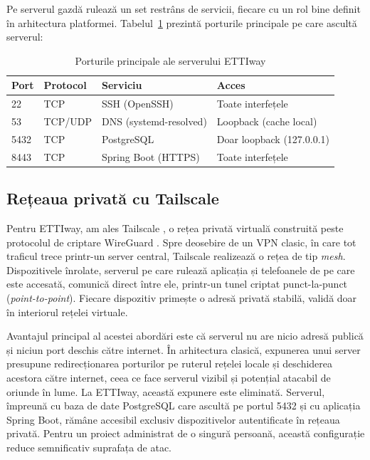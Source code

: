 Pe serverul gazdă rulează un set restrâns de servicii, fiecare cu 
un rol bine definit în arhitectura platformei. Tabelul~\ref{tab:porturi} 
prezintă porturile principale pe care ascultă serverul:

\begin{table}[htbp]
    \centering
    
    \begin{tabular}{llll}
        \toprule
        \textbf{Port} & \textbf{Protocol} & \textbf{Serviciu} & \textbf{Acces} \\
        \midrule
        22    & TCP & SSH (OpenSSH)            & Toate interfețele \\
        53    & TCP/UDP & DNS (systemd-resolved) & Loopback (cache local) \\
        5432  & TCP & PostgreSQL               & Doar loopback (127.0.0.1) \\
        8443  & TCP & Spring Boot (HTTPS)      & Toate interfețele \\
        \bottomrule
        
    \end{tabular}
    \caption{Porturile principale ale serverului ETTIway}
    \label{tab:porturi}
\end{table}




\subsection{Rețeaua privată cu Tailscale}
\label{subsec:tailscale-impl}

Pentru ETTIway, am ales Tailscale \cite{Tailscale}, o rețea privată virtuală
construită peste protocolul de criptare WireGuard \cite{Donenfeld2017}. Spre
deosebire de un VPN clasic, în care tot traficul trece printr-un server
central, Tailscale realizează o rețea de tip \textit{mesh}. Dispozitivele
înrolate, serverul pe care rulează aplicația și telefoanele de pe care este
accesată, comunică direct între ele, printr-un tunel criptat punct-la-punct (\textit{point-to-point}).
Fiecare dispozitiv primește o adresă privată stabilă, validă doar în
interiorul rețelei virtuale.

Avantajul principal al acestei abordări este că serverul nu are nicio adresă
publică și niciun port deschis către internet. În arhitectura clasică,
expunerea unui server presupune redirecționarea porturilor pe ruterul rețelei
locale și deschiderea acestora către internet, ceea ce face serverul vizibil
și potențial atacabil de oriunde în lume. La ETTIway, această expunere
este eliminată. Serverul, împreună cu baza de date PostgreSQL care ascultă pe
portul 5432 și cu aplicația Spring Boot, rămâne accesibil exclusiv
dispozitivelor autentificate în rețeaua privată. Pentru un proiect
administrat de o singură persoană, această configurație reduce semnificativ
suprafața de atac.

